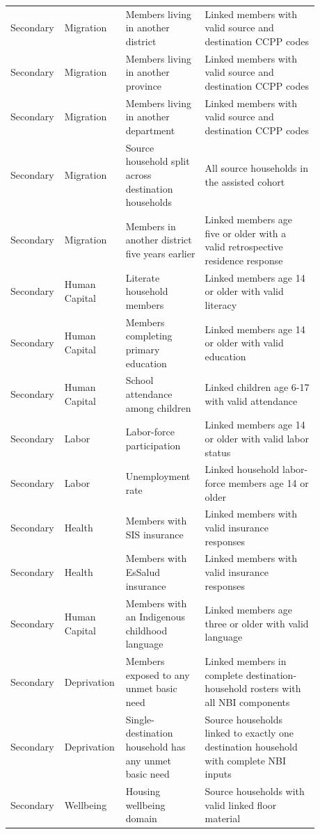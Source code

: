 \begin{longtable}{@{}>{\raggedright\arraybackslash}p{0.10\linewidth}p{0.17\linewidth}p{0.25\linewidth}p{0.36\linewidth}@{}}
Secondary & Migration & Members living in another district & Linked members with valid source and destination CCPP codes \\
Secondary & Migration & Members living in another province & Linked members with valid source and destination CCPP codes \\
Secondary & Migration & Members living in another department & Linked members with valid source and destination CCPP codes \\
Secondary & Migration & Source household split across destination households & All source households in the assisted cohort \\
Secondary & Migration & Members in another district five years earlier & Linked members age five or older with a valid retrospective residence response \\
Secondary & Human Capital & Literate household members & Linked members age 14 or older with valid literacy \\
Secondary & Human Capital & Members completing primary education & Linked members age 14 or older with valid education \\
Secondary & Human Capital & School attendance among children & Linked children age 6-17 with valid attendance \\
Secondary & Labor & Labor-force participation & Linked members age 14 or older with valid labor status \\
Secondary & Labor & Unemployment rate & Linked household labor-force members age 14 or older \\
Secondary & Health & Members with SIS insurance & Linked members with valid insurance responses \\
Secondary & Health & Members with EsSalud insurance & Linked members with valid insurance responses \\
Secondary & Human Capital & Members with an Indigenous childhood language & Linked members age three or older with valid language \\
Secondary & Deprivation & Members exposed to any unmet basic need & Linked members in complete destination-household rosters with all NBI components \\
Secondary & Deprivation & Single-destination household has any unmet basic need & Source households linked to exactly one destination household with complete NBI inputs \\
Secondary & Wellbeing & Housing wellbeing domain & Source households with valid linked floor material \\

\end{longtable}
